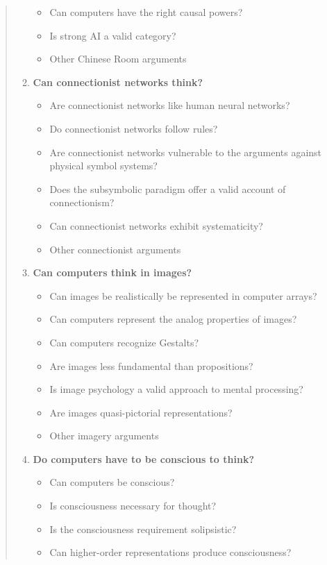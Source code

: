 \begin{quotation}
\begin{enumerate}
\begin{itemize}
        \item Can computers have the right causal powers?
        \item Is strong AI a valid category?
        \item Other Chinese Room arguments
      \end{itemize}
    \item \textbf{Can connectionist networks think?}
      \begin{itemize}
        \item Are connectionist networks like human neural networks?
        \item Do connectionist networks follow rules?
        \item Are connectionist networks vulnerable to the arguments against physical symbol systems?
        \item Does the subsymbolic paradigm offer a valid account of connectionism?
        \item Can connectionist networks exhibit systematicity?
        \item Other connectionist arguments
      \end{itemize}
    \item \textbf{Can computers think in images?}
      \begin{itemize}
        \item Can images be realistically be represented in computer arrays?
        \item Can computers represent the analog properties of images?
        \item Can computers recognize Gestalts?
        \item Are images less fundamental than propositions?
        \item Is image psychology a valid approach to mental processing?
        \item Are images quasi-pictorial representations?
        \item Other imagery arguments
      \end{itemize}
    \item \textbf{Do computers have to be conscious to think?}
      \begin{itemize}
        \item Can computers be conscious?
        \item Is consciousness necessary for thought?
        \item Is the consciousness requirement solipsistic?
        \item Can higher-order representations produce consciousness?

\end{itemize}
\end{enumerate}
\end{quotation}
